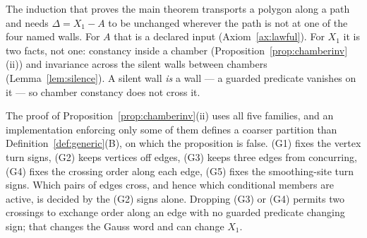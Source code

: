 \begin{remark}\label{rem:silencenew}
The induction that proves the main theorem transports a polygon along a path
and needs $\Delta=X_1-A$ to be unchanged wherever the path is not at one of the
four named walls. For $A$ that is a declared input (Axiom~\ref{ax:lawful}). For
$X_1$ it is two facts, not one: constancy inside a chamber
(Proposition~\ref{prop:chamberinv}(ii)) and invariance across the silent walls
between chambers (Lemma~\ref{lem:silence}). A silent wall \emph{is} a wall ---
a guarded predicate vanishes on it --- so chamber constancy does not cross it.
\end{remark}

\begin{remark}\label{rem:chamberguards}
The proof of Proposition~\ref{prop:chamberinv}(ii) uses all five families, and an
implementation enforcing only some of them defines a coarser partition than
Definition~\ref{def:generic}(B), on which the proposition is false. (G1) fixes the
vertex turn signs, (G2) keeps vertices off edges, (G3) keeps three edges from
concurring, (G4) fixes the crossing order along each edge, (G5) fixes the
smoothing-site turn signs. Which pairs of edges cross, and hence which
conditional members are active, is decided by the (G2) signs alone. Dropping (G3) or (G4) permits two crossings to
exchange order along an edge with no guarded predicate changing sign; that
changes the Gauss word and can change $X_1$.
\end{remark}
